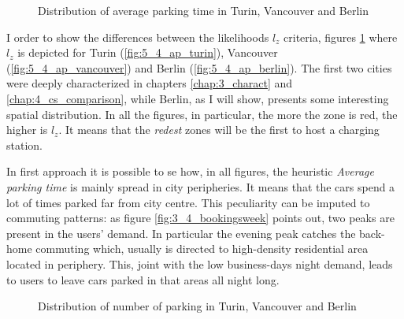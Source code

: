 \begin{figure}[th]
	\centering     %
	\quad
	\quad
	\caption{Distribution of average parking time in Turin, Vancouver and Berlin}
	\label{fig:5_4_heatmap_avgparking}
\end{figure}

I order to show the differences between the likelihoods $l_z$ criteria, figures \ref{fig:5_4_heatmap_avgparking} where $l_z$ is depicted for Turin (\ref{fig:5_4_ap_turin}), Vancouver (\ref{fig:5_4_ap_vancouver}) and Berlin (\ref{fig:5_4_ap_berlin}). The first two cities were deeply characterized in chapters \ref{chap:3_charact} and \ref{chap:4_cs_comparison}, while Berlin, as I will show, presents some interesting spatial distribution. In all the figures, in particular, the more the zone is red, the higher is $l_z$. It means that the \emph{redest} zones will be the first to host a charging station.

In first approach it is possible to se how, in all figures, the heuristic \textit{Average parking time} is mainly spread in city peripheries. It means that the cars spend a lot of times parked far from city centre. This peculiarity can be imputed to commuting patterns: as figure \ref{fig:3_4_bookingsweek} points out, two peaks are present in the users' demand. In particular the evening peak catches the back-home commuting which, usually is directed to high-density residential area located in periphery. This, joint with the low business-days night demand, leads to users to leave cars parked in that areas all night long.


\begin{figure}[th]
	\centering     %
	\quad
	\quad
	\caption{Distribution of number of parking in Turin, Vancouver and Berlin}
	\label{fig:5_4_heatmap_numparking}
\end{figure}

